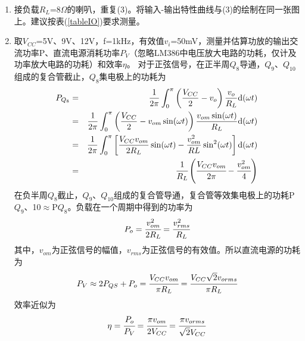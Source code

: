 \documentclass[a4paper]{article}
\begin{document}
\begin{enumerate}
\begin{enumerate}
\item 接负载$R_L$=8$\Omega$的喇叭，重复(3)。将输入-输出特性曲线与(3)的绘制在同一张图上。建议按表(\ref{tableIO})要求测量。
\item 取$V_{CC}$=5V、9V、12V，f=1kHz，有效值$v_i$=50mV，测量并估算功放的输出交流功率P、直流电源消耗功率$P_V$（忽略LM386中电压放大电路的功耗，仅计及功率放大电路的功耗）和效率$\eta$。
对于正弦信号，在正半周$Q_8$导通，$Q_9$、$Q_{10}$组成的复合管截止，$Q_8$集电极上的功耗为
\begin{eqnarray}
P_{Q_8}
 &=& \frac{1}{2\pi}\int^{\pi}_{0}\left(\frac{V_{CC}}{2} - v_o\right)\frac{v_o}{R_L}\text{d}(\omega t)\\
 &=& \frac{1}{2\pi}\int^{\pi}_{0}\left(\frac{V_{CC}}{2} - v_{om}\sin(\omega t)\right)\frac{v_{om}\sin(\omega t)}{R_L}\text{d}(\omega t)\\
 &=& \frac{1}{2\pi}\int^{\pi}_{0}\left[\frac{V_{CC}v_{om}}{2R_L}\sin(\omega t) - \frac{v_{om}^2}{RL}\sin^2(\omega t)\right]\text{d}(\omega t)\\
 &=& \cfrac{1}{R_L}\left(\cfrac{V_{CC}v_{om}}{2\pi} - \cfrac{v_{om}^2}{4}\right)
\end{eqnarray}
在负半周$Q_8$截止，$Q_9$、$Q_{10}$组成的复合管导通，复合管等效集电极上的功耗P$Q_9$、10$\approx$P$Q_8$。负载在一个周期中得到的功率为
\begin{equation}
P_o = \cfrac{v^2_{om}}{2R_L} = \cfrac{v_{rms}^2}{R_L}
\end{equation}
其中，$v_{om}$为正弦信号的幅值，$v_{rms}$为正弦信号的有效值。所以直流电源的功耗为
\begin{equation}
P_V \approx 2P_{QS}+P_o = \cfrac{V_{CC}v_{om}}{\pi R_L} = \cfrac{V_{CC}\sqrt{2}v_{orms}}{\pi R_L}
\end{equation}
效率近似为
\begin{equation}
\eta = \cfrac{P_o}{P_V} = \cfrac{\pi v_{om}}{2V_{CC}} = \cfrac{\pi v_{orms}}{\sqrt{2}V_{CC}}\label{eta}
\end{equation}
\end{enumerate}
\end{enumerate}
\end{document}
